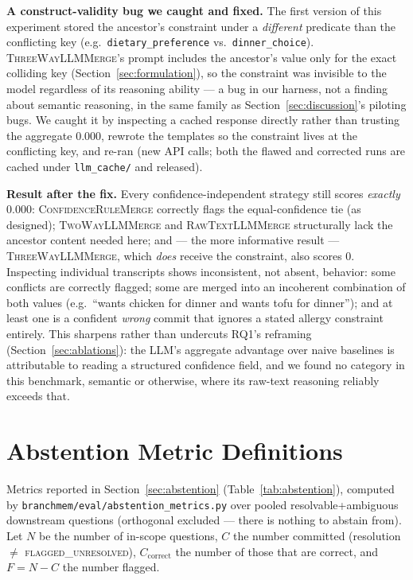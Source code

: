 \documentclass[11pt]{article}
\begin{document}
\textbf{A construct-validity bug we caught and fixed.} The first version of
this experiment stored the ancestor's constraint under a \emph{different}
predicate than the conflicting key (e.g.\ \texttt{dietary\_preference} vs.\
\texttt{dinner\_choice}). \textsc{ThreeWayLLMMerge}'s prompt includes the
ancestor's value only for the exact colliding key
(Section~\ref{sec:formulation}), so the constraint was invisible to the
model regardless of its reasoning ability --- a bug in our harness, not a
finding about semantic reasoning, in the same family as
Section~\ref{sec:discussion}'s piloting bugs. We caught it by inspecting a
cached response directly rather than trusting the aggregate $0.000$,
rewrote the templates so the constraint lives at the conflicting key, and
re-ran (new API calls; both the flawed and corrected runs are cached under
\texttt{llm\_cache/} and released).

\textbf{Result after the fix.} Every confidence-independent strategy still
scores \emph{exactly} $0.000$: \textsc{ConfidenceRuleMerge} correctly flags
the equal-confidence tie (as designed); \textsc{TwoWayLLMMerge} and
\textsc{RawTextLLMMerge} structurally lack the ancestor content needed
here; and --- the more informative result ---
\textsc{ThreeWayLLMMerge}, which \emph{does} receive the constraint, also
scores $0$. Inspecting individual transcripts shows inconsistent, not
absent, behavior: some conflicts are correctly flagged; some are merged
into an incoherent combination of both values (e.g.\ ``wants chicken for
dinner and wants tofu for dinner''); and at least one is a confident
\emph{wrong} commit that ignores a stated allergy constraint entirely. This
sharpens rather than undercuts RQ1's reframing
(Section~\ref{sec:ablations}): the LLM's aggregate advantage over naive
baselines is attributable to reading a structured confidence field, and we
found no category in this benchmark, semantic or otherwise, where its
raw-text reasoning reliably exceeds that.

\section{Abstention Metric Definitions}
\label{sec:abstention-metrics-def}

Metrics reported in Section~\ref{sec:abstention} (Table~\ref{tab:abstention}),
computed by \texttt{branchmem/eval/abstention\_metrics.py} over pooled
resolvable+ambiguous downstream questions (orthogonal excluded --- there is
nothing to abstain from). Let $N$ be the number of in-scope questions,
$C$ the number committed (resolution $\neq$ \textsc{flagged\_unresolved}),
$C_{\text{correct}}$ the number of those that are correct, and
$F = N - C$ the number flagged.
\end{document}
